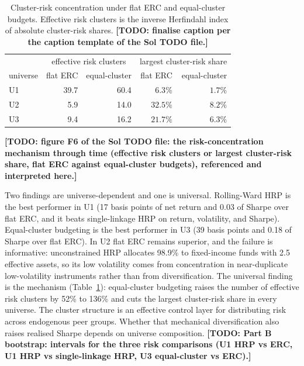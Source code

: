 \documentclass[11pt]{article}
\theoremstyle{remark}
\newcommand{\TODO}[1]{\textbf{[TODO: #1]}}
\begin{document}
\begin{table}[htbp]
\centering
\caption{Cluster-risk concentration under flat ERC and equal-cluster
budgets. Effective risk clusters is the inverse Herfindahl index of absolute
cluster-risk shares. \TODO{finalise caption per the caption template of the
Sol TODO file.}}
\label{tab:concentration}
\small
\begin{tabular}{lrrrr}
\toprule
 & \multicolumn{2}{c}{effective risk clusters}
 & \multicolumn{2}{c}{largest cluster-risk share} \\
universe & flat ERC & equal-cluster & flat ERC & equal-cluster \\
\midrule
U1 & 39.7 & 60.4 & $6.3\%$ & $1.7\%$ \\
U2 & 5.9 & 14.0 & $32.5\%$ & $8.2\%$ \\
U3 & 9.4 & 16.2 & $21.7\%$ & $6.3\%$ \\
\bottomrule
\end{tabular}
\end{table}

\TODO{figure F6 of the Sol TODO file: the risk-concentration mechanism
through time (effective risk clusters or largest cluster-risk share, flat ERC
against equal-cluster budgets), referenced and interpreted here.}

Two findings are universe-dependent and one is universal. Rolling-Ward HRP is
the best performer in U1 (17 basis points of net return and 0.03 of Sharpe
over flat ERC, and it beats single-linkage HRP on return, volatility, and
Sharpe). Equal-cluster budgeting is the best performer in U3 (39 basis points
and 0.18 of Sharpe over flat ERC). In U2 flat ERC remains superior, and the
failure is informative: unconstrained HRP allocates 98.9\% to fixed-income
funds with 2.5 effective assets, so its low volatility comes from
concentration in near-duplicate low-volatility instruments rather than from
diversification. The universal finding is the mechanism
(Table~\ref{tab:concentration}): equal-cluster budgeting raises the number of
effective risk clusters by 52\% to 136\% and cuts the largest cluster-risk
share in every universe. The cluster structure is an effective control layer
for distributing risk across endogenous peer groups. Whether that mechanical
diversification also raises realised Sharpe depends on universe composition.
\TODO{Part B bootstrap: intervals for the three risk comparisons (U1 HRP vs
ERC, U1 HRP vs single-linkage HRP, U3 equal-cluster vs ERC).}

\end{document}
